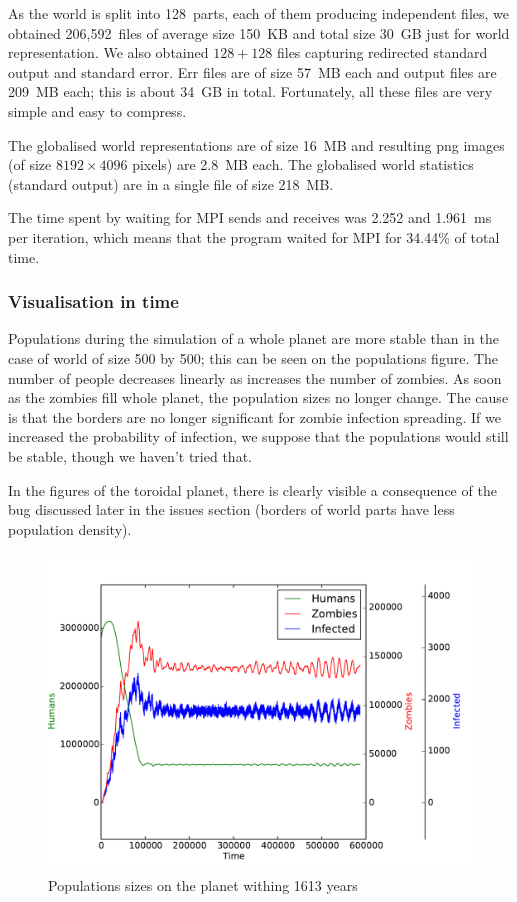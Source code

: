 \documentclass[a4paper]{article}
\begin{document}
As the world is split into 128~parts, each of them producing independent files, we obtained 206,592~files of average size 150~KB and total size 30~GB just for world representation.
We also obtained $128 + 128$ files capturing redirected standard output and standard error.
Err files are of size 57~MB each and output files are 209~MB each; this is about 34~GB in total.
Fortunately, all these files are very simple and easy to compress.

The globalised world representations are of size 16~MB and resulting png images (of size $8192\times 4096$ pixels) are 2.8~MB each.
The globalised world statistics (standard output) are in a single file of size 218~MB.

The time spent by waiting for MPI sends and receives was 2.252 and 1.961~ms per iteration, which means that the program waited for MPI for 34.44\% of total time.

\subsubsection{Visualisation in time}

Populations during the simulation of a whole planet are more stable than in the case of world of size 500 by 500; this can be seen on the populations figure.
The number of people decreases linearly as increases the number of zombies.
As soon as the zombies fill whole planet, the population sizes no longer change.
The cause is that the borders are no longer significant for zombie infection spreading.
If we increased the probability of infection, we suppose that the populations would still be stable, though we haven't tried that.

In the figures of the toroidal planet, there is clearly visible a consequence of the bug discussed later in the issues section (borders of world parts have less population density).

\begin{figure}[ht]
    \centering
    \includegraphics[width=\textwidth]{torus/planet.pdf}
    \caption{Populations sizes on the planet withing 1613 years}
\end{figure}
\end{document}
